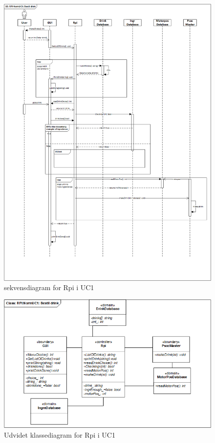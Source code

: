 \begin{figure}[H]
    \centering
    \includegraphics[width=1\textwidth]{Images/Applikationsmodeller/rpi/rpi_sekvensdiagramNormUC1.png}
    \caption{sekvensdiagram for Rpi i UC1}
    \label{fig:sdUC1Rpi}
\end{figure}

\begin{figure}[H]
    \centering
    \includegraphics[width=1\textwidth]{Images/Applikationsmodeller/rpi/rpi_UdvidetklassediagramNormUC1.png}
    \caption{Udvidet klassediagram for Rpi i UC1}
    \label{fig:UcdUC1Rpi}
\end{figure}

